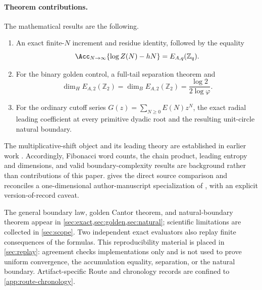 \paragraph{Theorem contributions.}
The mathematical results are the following.
\begin{enumerate}[label=(T\arabic*)]
  \item An exact finite-\(N\) increment and residue identity, followed by the
  equality
  \[
    \Acc_{N\to\infty}\{\log Z(N)-hN\}=E_{A,q}(\mathbb Z_q).
  \]
  \item For the binary golden control, a full-tail separation theorem and
  \[
    \dim_H E_{A,2}(\mathbb Z_2)
    =\dim_B E_{A,2}(\mathbb Z_2)
    =\frac{\log2}{2\log\varphi}.
  \]
  \item For the ordinary cutoff series \(G(z)=\sum_{N\ge0}E(N)z^N\), the
  exact radial leading coefficient at every primitive dyadic root and the
  resulting unit-circle natural boundary.
\end{enumerate}

The multiplicative-shift object and its leading theory are established in
earlier work \citep{fan2012level,kenyon2012hausdorff,ban2019pattern}.
Accordingly, Fibonacci word counts, the chain product, leading entropy and
dimensions, and valid boundary-complexity results are background rather than
contributions of this paper.   gives the direct source
comparison and reconciles a one-dimensional author-manuscript specialization
of \citet{ban2023boundary}, with an explicit version-of-record caveat.

The general boundary law, golden Cantor theorem, and natural-boundary theorem
appear in \cref{sec:exact,sec:golden,sec:natural}; scientific limitations are
collected in \cref{sec:scope}.  Two independent exact evaluators also replay
finite consequences of the formulas.  This reproducibility material is
placed in \cref{sec:replay}: agreement checks implementations only and is not
used to prove uniform convergence, the accumulation equality, separation, or
the natural boundary.  Artifact-specific Route and chronology records are
confined to \cref{app:route-chronology}.
